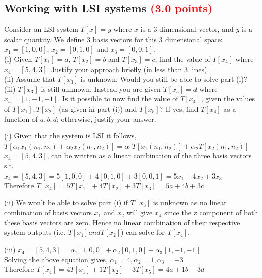 \documentclass[answers]{exam}
\newcommand{\mypoints}[1]{\textcolor{red}{(#1 points)}}
\begin{document}
\subsection{ Working with LSI systems \mypoints{3.0}}\label{sssec:Linearity}
Consider an LSI system $T[x] = y$ where $x$ is a 3 dimensional vector, and $y$ is a scalar quantity. We define 3 basis vectors for this 3 dimensional space: $x_1 = [1,0,0]$, $x_2 = [0,1,0]$ and $x_3 = [0,0,1]$. \\
(i) Given $T[x_1] = a$, $T[x_2] = b$ and $T[x_3] = c$, find the value of $T[x_4]$ where $x_4 = [5,4,3]$. Justify your approach briefly (in less than 3 lines).\\
(ii) Assume that $T[x_3]$ is unknown. Would you still be able to solve part (i)? \\ 
(iii) $T[x_3]$ is still unknown. Instead you are given $T[x_5] = d$ where $x_5 = [1,-1,-1]$. Is it possible to now find the value of $T[x_4]$, given the values of $T[x_1], T[x_2]$ (as given in part (i)) and $T[x_5]$? If yes, find $T[x_4]$ as a function of $a,b,d$; otherwise, justify your answer.
\begin{solution}
(i) Given that the system is LSI it follows, \\
$T[\alpha_{1} x_{1} (n_1, n_2) + \alpha_{2} x_{2} (n_1, n_2)] = \alpha_{1}T[x_{1}(n_1, n_2)] + \alpha_{2}T[x_{2}(n_1, n_2)]$\\
$x_4 = [5, 4, 3]$, can be written as a linear combination of the three basis vectors s.t.\\
$x_4 = [5, 4, 3] = 5[1, 0, 0] + 4[0, 1, 0] + 3[0, 0, 1] = 5x_1 + 4x_2 + 3x_3$\\
Therefore $T[x_4] = 5T[x_1] + 4T[x_2] +3T[x_3] = 5a+4b+3c$

(ii) We won't be able to solve part (i) if $T[x_3]$ is unknown as no linear combination of basis vectors $x_1$ and $x_2$ will give $x_4$ since the z component of both these basis vectors are zero. Hence no linear combination of their respective system outputs (i.e. $T[x_1] and T[x_2]$) can solve for $T[x_4]$.

(iii) $x_4 = [5, 4, 3] = \alpha_1[1, 0, 0] +\alpha_2[0, 1, 0] + \alpha_3[1, -1, -1]$\\
Solving the above equation gives, $\alpha_1 = 4, \alpha_2= 1, \alpha_3 = -3 $\\
Therefore $T[x_4] = 4T[x_1] + 1T[x_2] -3T[x_5] = 4a+1b-3d$\\

\end{solution}
\end{document}
